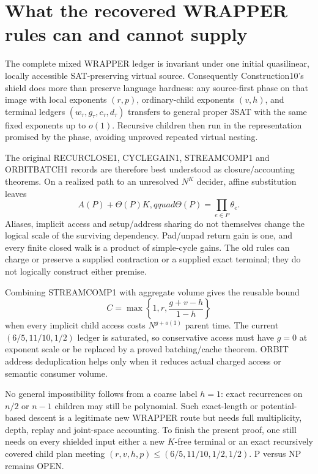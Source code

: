 \section{What the recovered WRAPPER rules can and cannot supply}

The complete mixed WRAPPER ledger is invariant under one initial
quasilinear, locally accessible SAT-preserving virtual source.  Consequently
Construction10's shield does more than preserve language hardness: any
source-first phase on that image with local exponents $(r,p)$, ordinary-child
exponents $(v,h)$, and terminal ledgers
$(w_\tau,g_\tau,c_\tau,d_\tau)$ transfers to general proper 3SAT with the
same fixed exponents up to $o(1)$.  Recursive children then run in the
representation promised by the phase, avoiding unproved repeated virtual
nesting.

The original RECURCLOSE1, CYCLEGAIN1, STREAMCOMP1 and ORBITBATCH1 records are
therefore best understood as closure/accounting theorems.  On a realized
path to an unresolved $N^K$ decider, affine substitution leaves
\[
 A(P)+\Theta(P)K,qquad \Theta(P)=\prod_{e\in P}\theta_e.
\]
Aliases, implicit access and setup/address sharing do not themselves change
the logical scale of the surviving dependency.  Pad/unpad return gain is
one, and every finite closed walk is a product of simple-cycle gains.  The
old rules can charge or preserve a supplied contraction or a supplied exact
terminal; they do not logically construct either premise.

Combining STREAMCOMP1 with aggregate volume gives the reusable bound
\[
 C=\max\left\{1,r,\frac{g+v-h}{1-h}\right\}
\]
when every implicit child access costs $N^{g+o(1)}$ parent time.  The current
$(6/5,11/10,1/2)$ ledger is saturated, so conservative access must have
$g=0$ at exponent scale or be replaced by a proved batching/cache theorem.
ORBIT address deduplication helps only when it reduces actual charged access
or semantic consumer volume.

No general impossibility follows from a coarse label $h=1$: exact recurrences
on $n/2$ or $n-1$ children may still be polynomial.  Such exact-length or
potential-based descent is a legitimate new WRAPPER route but needs full
multiplicity, depth, replay and joint-space accounting.  To finish the
present proof, one still needs on every shielded input either a new $K$-free
terminal or an exact recursively covered child plan meeting
$(r,v,h,p)\le(6/5,11/10,1/2,1/2)$.  P versus NP remains OPEN.
